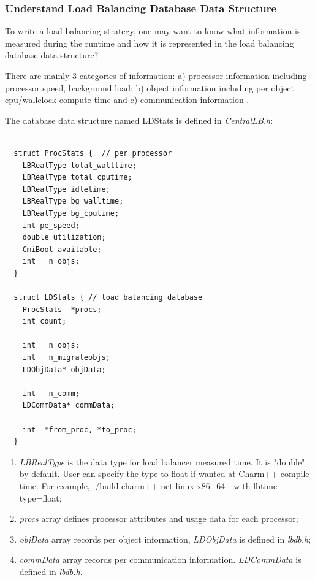 \subsubsection{Understand Load Balancing Database Data Structure}

\label{lbdatabase}

To write a load balancing strategy, one may want to know 
what information is measured during the runtime and how it is represented in
the load balancing database data structure?

There are mainly 3 categories of information: a) processor information including processor speed, background load; b) object information including per object
cpu/wallclock compute time and c) communication information .

The database data structure named {\kw LDStats} is defined in {\em CentralLB.h}:

\begin{verbatim}

  struct ProcStats {  // per processor
    LBRealType total_walltime;
    LBRealType total_cputime;
    LBRealType idletime;
    LBRealType bg_walltime;
    LBRealType bg_cputime;
    int pe_speed;
    double utilization;
    CmiBool available;
    int   n_objs;
  }

  struct LDStats { // load balancing database
    ProcStats  *procs;
    int count;

    int   n_objs;
    int   n_migrateobjs;
    LDObjData* objData;

    int   n_comm;
    LDCommData* commData;

    int  *from_proc, *to_proc;
  }

\end{verbatim}

\begin{enumerate}
\item {\em LBRealType} is the data type for load balancer measured time. It is "double" by default. User can specify the type to float if wanted at Charm++ compile time. For example, ./build charm++ net-linux-x86\_64 {-}{-}with-lbtime-type=float;
\item {\em procs} array defines processor attributes and usage data for each
processor;
\item {\em objData} array records per object information, {\em LDObjData} is defined in {\em lbdb.h};
\item {\em commData} array records per communication information. {\em LDCommData} is defined in {\em lbdb.h}.
\end{enumerate}

